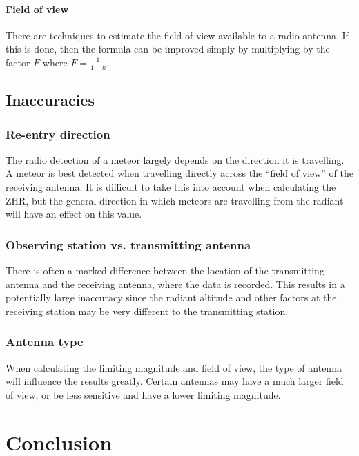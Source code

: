 \paragraph{Field of view\\}

There are techniques to estimate the field of view available to a radio
antenna. If this is done, then the formula can be improved simply by
multiplying by the factor $F$ where $F = \frac{1}{1-k}$.

\subsection{Inaccuracies}

\subsubsection{Re-entry direction}

The radio detection of a meteor largely depends on the direction it is
travelling. A meteor is best detected when travelling directly across the
``field of view'' of the receiving antenna. It is difficult to take this into
account when calculating the ZHR, but the general direction in which meteors
are travelling from the radiant will have an effect on this value.

\subsubsection{Observing station vs. transmitting antenna}

There is often a marked difference between the location of the transmitting
antenna and the receiving antenna, where the data is recorded. This results in
a potentially large inaccuracy since the radiant altitude and other factors at
the receiving station may be very different to the transmitting station.

\subsubsection{Antenna type}

When calculating the limiting magnitude and field of view, the type of antenna
will influence the results greatly. Certain antennas may have a much larger
field of view, or be less sensitive and have a lower limiting magnitude. 

\section{Conclusion}

